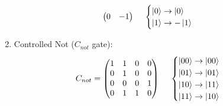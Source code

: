 \documentclass{article}
\begin{document}
\begin{enumerate}
\begin{align}
\begin{pmatrix}
            0 & -1
        \end{pmatrix}
        \ \ \ \
        &
        \begin{cases}
            \ket{0} \to \ket{0} \\
            \ket{1} \to -\ket{1}
        \end{cases}
    \end{align}
    \item Controlled Not ($C_{not}$ gate):
    \begin{align}
        C_{not} = 
        \begin{pmatrix}
            1 & 1 & 0 & 0 \\
            0 & 1 & 0 & 0 \\
            0 & 0 & 0 & 1 \\
            0 & 1 & 1 & 0
        \end{pmatrix}
        \ \ \ \
        &
        \begin{cases}
            \ket{00} \to \ket{00} \\
            \ket{01} \to \ket{01} \\
            \ket{10} \to \ket{11} \\
            \ket{11} \to \ket{10} 
        \end{cases}
    \end{align}
    

\end{enumerate}
\end{document}
